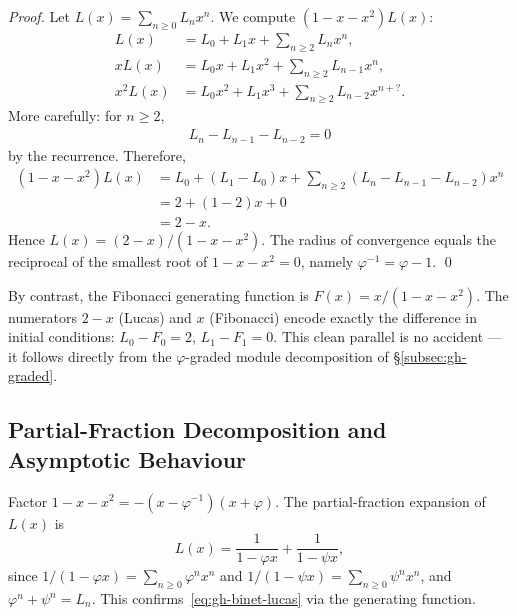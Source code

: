 \begin{proof}
Let \(L(x) = \sum_{n \geq 0} L_n x^n\).
We compute \((1-x-x^2)L(x)\):
\begin{align*}
  L(x)     &= L_0 + L_1 x + \sum_{n \geq 2} L_n x^n, \\
  xL(x)    &= L_0 x + L_1 x^2 + \sum_{n \geq 2} L_{n-1} x^n, \\
  x^2 L(x) &= L_0 x^2 + L_1 x^3 + \sum_{n \geq 2} L_{n-2} x^{n+?}.
\end{align*}
More carefully: for \(n \geq 2\),
\begin{align*}
  L_n - L_{n-1} - L_{n-2} = 0
\end{align*}
by the recurrence.  Therefore,
\begin{align*}
  (1-x-x^2)L(x)
  &= L_0 + (L_1 - L_0)x + \sum_{n \geq 2}(L_n - L_{n-1} - L_{n-2})x^n \\
  &= 2 + (1 - 2)x + 0 \\
  &= 2 - x.
\end{align*}
Hence \(L(x) = (2-x)/(1-x-x^2)\).
The radius of convergence equals the reciprocal of the smallest root of
\(1-x-x^2 = 0\), namely \(\varphi^{-1} = \varphi - 1\).
\qed
\end{proof}

\begin{remark}
By contrast, the Fibonacci generating function is
\(F(x) = x/(1-x-x^2)\).
The numerators \(2-x\) (Lucas) and \(x\) (Fibonacci) encode exactly
the difference in initial conditions:
\(L_0 - F_0 = 2\), \(L_1 - F_1 = 0\).
This clean parallel is no accident — it follows directly from the
\(\varphi\)-graded module decomposition of \S\ref{subsec:gh-graded}.
\end{remark}

\subsection{Partial-Fraction Decomposition and Asymptotic Behaviour}
\label{subsec:gh-pfd}

Factor \(1-x-x^2 = -(x-\varphi^{-1})(x+\varphi)\).
The partial-fraction expansion of \(L(x)\) is
\begin{equation}\label{eq:gh-pfd}
  L(x) = \frac{1}{1 - \varphi x} + \frac{1}{1 - \psi x},
\end{equation}
since \(1/(1-\varphi x) = \sum_{n \geq 0} \varphi^n x^n\) and
\(1/(1-\psi x) = \sum_{n \geq 0} \psi^n x^n\),
and \(\varphi^n + \psi^n = L_n\).
This confirms~\eqref{eq:gh-binet-lucas} via the generating function.

